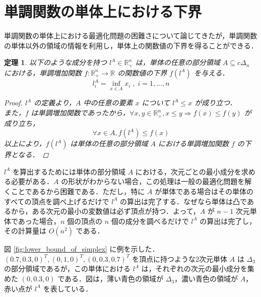 \documentclass[a4paper,11pt]{jreport}
\newtheorem{theorem}{定理}
\begin{document}
\section{単調関数の単体上における下界} \label{sec:lower_bound_of_monotonic_function_on_simplex}

単調関数の単体上における最適化問題の困難さについて論じてきたが，単調関数の単体以外の領域の情報を利用し，単体上の関数値の下界を得ることができる．

\begin{theorem}\label{thm:lower_bound_of_monotonic_function}
以下のような成分を持つ $ l^A \in \mathbb{R}^n_{+} $ は，単体の任意の部分領域 $ A \subseteq c \Delta_n $ における，単調増加関数 $ f :  \mathbb{R}^n_{+} \to \mathbb{R} $ の関数値の下界 $ f(l^A) $ を与える．
$$ l^A_i = \inf_{x \in A } x_i \; , \; i = 1, ..., n $$

\begin{proof}
$ l^A $ の定義より，$ A $ 中の任意の要素 $ x $ について $ l^A \leq x $ が成り立つ．\\
また，$ f $ は単調増加関数であったから，$ \forall x, y \in \mathbb{R}^n_{+}, x \leq y \Rightarrow f(x) \leq f(y) $ が成り立ち，
$$ \forall x \in A, f(l^A) \leq f(x) $$
以上により，$ f(l^A) $ は単体の任意の部分領域 $ A $ における単調増加関数 $ f $ の下界となる．
\end{proof}

\end{theorem}

$ l^A $ を算出するためには単体の部分領域 $ A $ における，次元ごとの最小成分を求める必要がある．$ A $ の形状がわからない場合，この処理は一般の最適化問題を解くことであるから困難である．ただし，特に $ A $ が単体である場合はその単体のすべての頂点を調べ上げるだけで $ l^A $ の算出は完了する．なぜなら単体は凸であるから，ある次元の最小の変数値は必ず頂点が持つ．よって，$ A $ が $ n - 1 $ 次元単体であった場合，$ n $ 個の頂点の $ n $ 個の成分を調べるだけで $ l^A $ の算出は完了し，その計算量は $ O(n^2) $ である． \par
図 \ref{fig:lower_bound_of_simplex} に例を示した．$ (0.7, 0.3, 0)^T, (0, 1, 0)^T, (0, 0.3, 0.7)^T $ を頂点に持つような2次元単体 $ A $ は $ \Delta_3 $ の部分領域であるが，この単体における $ l^{A} $ は，それぞれの次元の最小成分を集めた $ (0, 0.3, 0) $ である．図は，薄い青色の領域が $ \Delta_3 $，濃い青色の領域が $ A $，赤い点が $ l^{A} $ を表している．\par
\end{document}
